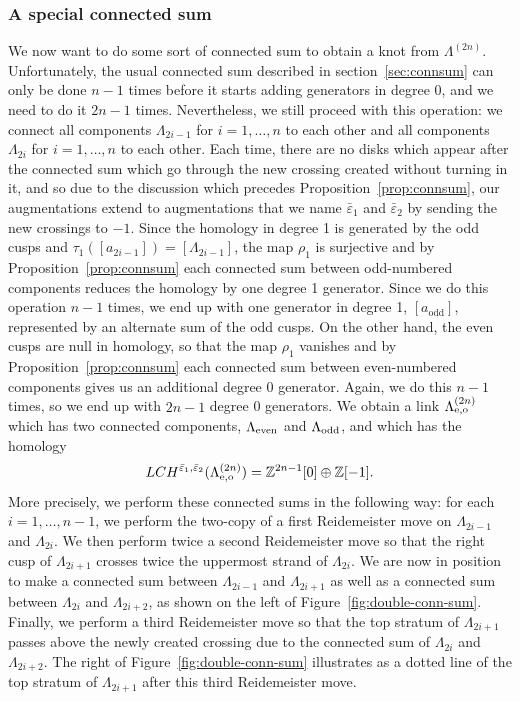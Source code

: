 \documentclass[11pt]{amsart}
\theoremstyle{plain}
\theoremstyle{remark}
\numberwithin{equation}{section}
\newcommand{\Z}{\ensuremath{\mathbb{Z}}}
\begin{document}
\subsubsection{A special connected sum}\label{subsection:unclasp}
We now want to do some sort of connected sum to obtain a knot from $\Lambda^{(2n)}$. Unfortunately, the usual connected sum described in section~\ref{sec:connsum} can only be done $n-1$ times before it starts adding generators in degree 0, and we need to do it $2n-1$ times. Nevertheless, we still proceed with this operation: we connect all components $\Lambda_{2i-1}$ for $i = 1, \ldots, n$ to each other and all components $\Lambda_{2i}$ for $i = 1, \ldots, n$ to each other. Each time, there are no disks which appear after the connected sum which go through the new crossing created without turning in it, and so due to the discussion which precedes Proposition~\ref{prop:connsum}, our augmentations extend to augmentations that we name $\bar\varepsilon_1$ and $\bar\varepsilon_2$ by sending the new crossings to $-1$. Since the homology in degree 1 is generated by the odd cusps and $\tau_1([a_{2i-1}]) = [\Lambda_{2i-1}]$, the map $\rho_1$ is surjective and by Proposition~\ref{prop:connsum} each connected sum between odd-numbered components reduces the homology by one degree 1 generator. Since we do this operation $n-1$ times, we end up with one generator in degree 1,  $[a_{\text{odd}}]$, represented by an alternate sum of the odd cusps. On the other hand, the even cusps are null in homology, so that the map $\rho_1$ vanishes and by Proposition~\ref{prop:connsum} each connected sum between even-numbered components gives us an additional degree 0 generator. Again, we do this $n-1$ times, so we end up with $2n-1$ degree 0 generators. We obtain a link $\Lambda^{(2n)}_{\rm e,o}$ which has two connected components, $\Lambda_{\rm even}$ and $\Lambda_{\rm odd}$, and which has the homology
 $$
 LCH^{\bar\varepsilon_1,\bar\varepsilon_2}(\Lambda^{(2n)}_{\rm e,o}) = \Z^{2n-1}[0] \oplus \Z[-1].
 $$
 More precisely, we perform these connected sums in the following way: for each $i= 1, \dots, n-1$, we perform the two-copy of a first Reidemeister move
 on $\Lambda_{2i-1}$ and $\Lambda_{2i}$. We then perform twice a second Reidemeister move so that the right cusp of $\Lambda_{2i+1}$ crosses
 twice the uppermost strand of $\Lambda_{2i}$. We are now in position to make a connected sum between $\Lambda_{2i-1}$ and $\Lambda_{2i+1}$
 as well as a connected sum between $\Lambda_{2i}$ and $\Lambda_{2i+2}$, as shown on the left of Figure~\ref{fig:double-conn-sum}.
Finally, we perform a third Reidemeister move so that the top stratum of $\Lambda_{2i+1}$ passes above the newly created crossing due to 
the connected sum of $\Lambda_{2i}$ and $\Lambda_{2i+2}$. The right of Figure~\ref{fig:double-conn-sum} illustrates as a dotted line of the
top stratum of $\Lambda_{2i+1}$ after this third Reidemeister move.
  
\end{document}
